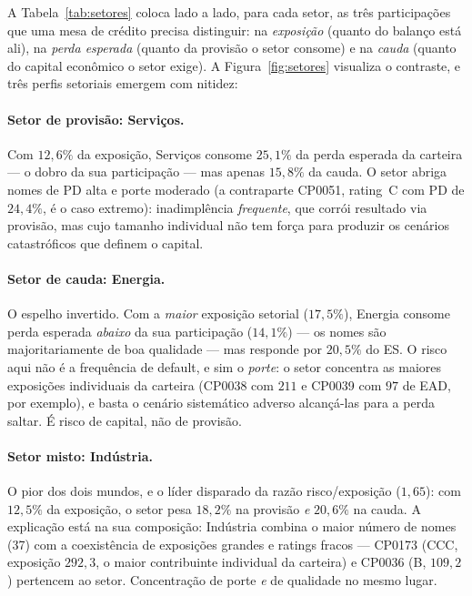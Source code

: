 \documentclass[11pt,a4paper]{article}
\begin{document}
A Tabela~\ref{tab:setores} coloca lado a lado, para cada setor, as três participações que uma mesa de crédito precisa distinguir: na \emph{exposição} (quanto do balanço está ali), na \emph{perda esperada} (quanto da provisão o setor consome) e na \emph{cauda} (quanto do capital econômico o setor exige). A Figura~\ref{fig:setores} visualiza o contraste, e três perfis setoriais emergem com nitidez:

\paragraph{Setor de provisão: Serviços.} Com $12{,}6\%$ da exposição, Serviços consome $25{,}1\%$ da perda esperada da carteira --- o dobro da sua participação --- mas apenas $15{,}8\%$ da cauda. O setor abriga nomes de PD alta e porte moderado (a contraparte CP0051, rating~C com PD de $24{,}4\%$, é o caso extremo): inadimplência \emph{frequente}, que corrói resultado via provisão, mas cujo tamanho individual não tem força para produzir os cenários catastróficos que definem o capital.

\paragraph{Setor de cauda: Energia.} O espelho invertido. Com a \emph{maior} exposição setorial ($17{,}5\%$), Energia consome perda esperada \emph{abaixo} da sua participação ($14{,}1\%$) --- os nomes são majoritariamente de boa qualidade --- mas responde por $20{,}5\%$ do ES. O risco aqui não é a frequência de default, e sim o \emph{porte}: o setor concentra as maiores exposições individuais da carteira (CP0038 com $211$ e CP0039 com $97$ de EAD, por exemplo), e basta o cenário sistemático adverso alcançá-las para a perda saltar. É risco de capital, não de provisão.

\paragraph{Setor misto: Indústria.} O pior dos dois mundos, e o líder disparado da razão risco/exposição ($1{,}65$): com $12{,}5\%$ da exposição, o setor pesa $18{,}2\%$ na provisão \emph{e} $20{,}6\%$ na cauda. A explicação está na sua composição: Indústria combina o maior número de nomes (37) com a coexistência de exposições grandes e ratings fracos --- CP0173 (CCC, exposição $292{,}3$, o maior contribuinte individual da carteira) e CP0036 (B, $109{,}2$) pertencem ao setor. Concentração de porte \emph{e} de qualidade no mesmo lugar.
\end{document}
